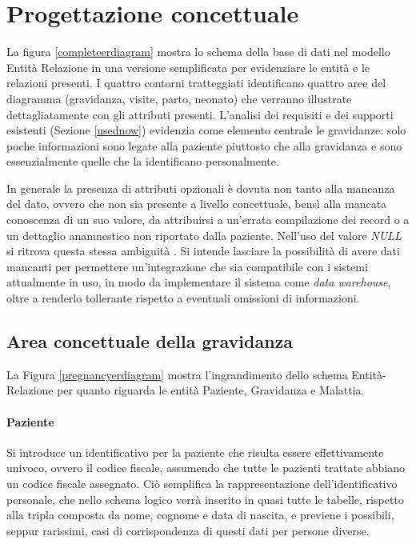 \chapter{Progettazione concettuale}
\label{conceptual}

\newcommand{\ent}[1]{{\Large #1}}
\newcommand{\card}[1]{{\footnotesize #1}}
\newcommand{\CZU}{\card{(0,1)}}
\newcommand{\CZN}{\card{(0,n)}}
\newcommand{\CUU}{\card{(1,1)}}
\newcommand{\CUN}{\card{(1,n)}}

La figura \ref{completeerdiagram} mostra lo schema della base di dati nel modello Entità Relazione in una versione semplificata per evidenziare le entità e le relazioni presenti.
I quattro contorni tratteggiati identificano quattro aree del diagramma (gravidanza, visite, parto, neonato) che verranno illustrate dettagliatamente con gli attributi presenti.
L'analisi dei requisiti e dei supporti esistenti (Sezione \ref{usednow}) evidenzia come elemento centrale le gravidanze: solo poche informazioni sono legate alla paziente piuttosto che alla gravidanza e sono essenzialmente quelle che la identificano personalmente.

In generale la presenza di attributi opzionali è dovuta non tanto alla mancanza del dato, ovvero che non sia presente a livello concettuale, bensì alla mancata conoscenza di un suo valore, da attribuirsi a un'errata compilazione dei record o a un dettaglio anamnestico non riportato dalla paziente.
Nell'uso del valore \emph{NULL} si ritrova questa stessa ambiguità \cite{Sil11}.
Si intende lasciare la possibilità di avere dati mancanti per permettere un'integrazione che sia compatibile con i sistemi attualmente in uso, in modo da implementare il sistema come \emph{data warehouse}, oltre a renderlo tollerante rispetto a eventuali omissioni di informazioni.

\section{Area concettuale della gravidanza}
\label{pregnancyconceptual}

La Figura \ref{pregnancyerdiagram} mostra l'ingrandimento dello schema Entità-Relazione per quanto riguarda le entità Paziente, Gravidanza e Malattia.

\subsubsection{Paziente}

Si introduce un identificativo per la paziente che risulta essere effettivamente univoco, ovvero il codice fiscale, assumendo che tutte le pazienti trattate abbiano un codice fiscale assegnato.
Ciò semplifica la rappresentazione dell'identificativo personale, che nello schema logico verrà inserito in quasi tutte le tabelle, rispetto alla tripla composta da nome, cognome e data di nascita, e previene i possibili, seppur rarissimi, casi di corrispondenza di questi dati per persone diverse.


